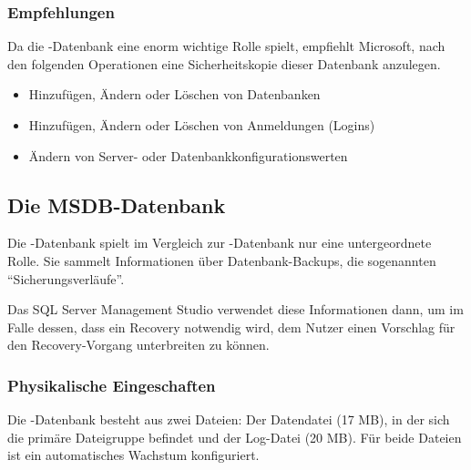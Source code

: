        \subsubsection{Empfehlungen}
          Da die -Datenbank eine enorm wichtige Rolle spielt,
          empfiehlt Microsoft, nach den folgenden Operationen eine
          Sicherheitskopie dieser Datenbank anzulegen.
          \begin{itemize}
            \item Hinzufügen, Ändern oder Löschen von Datenbanken
            \item Hinzufügen, Ändern oder Löschen von Anmeldungen (Logins)
            \item Ändern von Server- oder Datenbankkonfigurationswerten
          \end{itemize}
          \begin{literaturinternet}
            \item \cite{ms187837}
          \end{literaturinternet}
      \subsection{Die MSDB-Datenbank}
        Die -Datenbank spielt im Vergleich zur
        -Datenbank nur eine untergeordnete Rolle. Sie sammelt
        Informationen über Datenbank-Backups, die sogenannten
        \enquote{Sicherungsverläufe}.
        
        Das SQL Server Management Studio verwendet diese Informationen dann, um
        im Falle dessen, dass ein Recovery notwendig wird, dem Nutzer einen
        Vorschlag für den Recovery-Vorgang unterbreiten zu können.
        \subsubsection{Physikalische Eingeschaften}
          Die -Datenbank besteht aus zwei Dateien: Der
          Datendatei  (17 MB), in der sich die
          primäre Dateigruppe befindet und der Log-Datei
           (20 MB). Für beide Dateien ist ein
          automatisches Wachstum konfiguriert.
